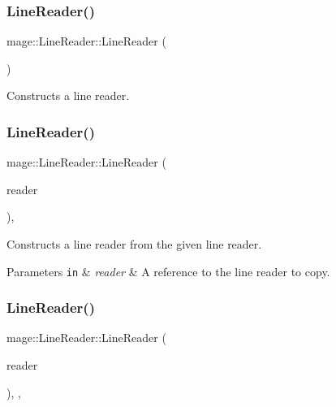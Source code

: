 \subsubsection{\texorpdfstring{Line\+Reader()}{LineReader()}\hspace{0.1cm}{\footnotesize\ttfamily [1/3]}}
{\footnotesize\ttfamily mage\+::\+Line\+Reader\+::\+Line\+Reader (\begin{DoxyParamCaption}{ }\end{DoxyParamCaption})\hspace{0.3cm}{\ttfamily [protected]}}

Constructs a line reader. \hypertarget{classmage_1_1_line_reader_ae4f871bebae110704b34c0bd88460639}{}\label{classmage_1_1_line_reader_ae4f871bebae110704b34c0bd88460639} 
\subsubsection{\texorpdfstring{Line\+Reader()}{LineReader()}\hspace{0.1cm}{\footnotesize\ttfamily [2/3]}}
{\footnotesize\ttfamily mage\+::\+Line\+Reader\+::\+Line\+Reader (\begin{DoxyParamCaption}\item[{const \hyperlink{classmage_1_1_line_reader}{Line\+Reader} \&}]{reader }\end{DoxyParamCaption})\hspace{0.3cm}{\ttfamily [protected]}, {\ttfamily [delete]}}

Constructs a line reader from the given line reader.


\begin{DoxyParams}[1]{Parameters}
\mbox{\tt in}  & {\em reader} & A reference to the line reader to copy. \\
\hline
\end{DoxyParams}
\hypertarget{classmage_1_1_line_reader_ae90c546a98e113a48ca1c94b854a4866}{}\label{classmage_1_1_line_reader_ae90c546a98e113a48ca1c94b854a4866} 
\subsubsection{\texorpdfstring{Line\+Reader()}{LineReader()}\hspace{0.1cm}{\footnotesize\ttfamily [3/3]}}
{\footnotesize\ttfamily mage\+::\+Line\+Reader\+::\+Line\+Reader (\begin{DoxyParamCaption}\item[{\hyperlink{classmage_1_1_line_reader}{Line\+Reader} \&\&}]{reader }\end{DoxyParamCaption})\hspace{0.3cm}{\ttfamily [protected]}, {\ttfamily [default]}, {\ttfamily [noexcept]}}


